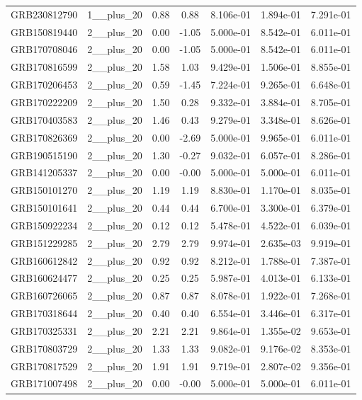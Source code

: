 \documentclass[12pt]{article}
\begin{document}
\begin{table}[h!]
{\begin{tabular}{l c c c c c c}
GRB230812790 & 1__plus_20 & 0.88 & 0.88 & 8.106e-01 & 1.894e-01 & 7.291e-01 \\
GRB150819440 & 2__plus_20 & 0.00 & -1.05 & 5.000e-01 & 8.542e-01 & 6.011e-01 \\
GRB170708046 & 2__plus_20 & 0.00 & -1.05 & 5.000e-01 & 8.542e-01 & 6.011e-01 \\
GRB170816599 & 2__plus_20 & 1.58 & 1.03 & 9.429e-01 & 1.506e-01 & 8.855e-01 \\
GRB170206453 & 2__plus_20 & 0.59 & -1.45 & 7.224e-01 & 9.265e-01 & 6.648e-01 \\
GRB170222209 & 2__plus_20 & 1.50 & 0.28 & 9.332e-01 & 3.884e-01 & 8.705e-01 \\
GRB170403583 & 2__plus_20 & 1.46 & 0.43 & 9.279e-01 & 3.348e-01 & 8.626e-01 \\
GRB170826369 & 2__plus_20 & 0.00 & -2.69 & 5.000e-01 & 9.965e-01 & 6.011e-01 \\
GRB190515190 & 2__plus_20 & 1.30 & -0.27 & 9.032e-01 & 6.057e-01 & 8.286e-01 \\
GRB141205337 & 2__plus_20 & 0.00 & -0.00 & 5.000e-01 & 5.000e-01 & 6.011e-01 \\
GRB150101270 & 2__plus_20 & 1.19 & 1.19 & 8.830e-01 & 1.170e-01 & 8.035e-01 \\
GRB150101641 & 2__plus_20 & 0.44 & 0.44 & 6.700e-01 & 3.300e-01 & 6.379e-01 \\
GRB150922234 & 2__plus_20 & 0.12 & 0.12 & 5.478e-01 & 4.522e-01 & 6.039e-01 \\
GRB151229285 & 2__plus_20 & 2.79 & 2.79 & 9.974e-01 & 2.635e-03 & 9.919e-01 \\
GRB160612842 & 2__plus_20 & 0.92 & 0.92 & 8.212e-01 & 1.788e-01 & 7.387e-01 \\
GRB160624477 & 2__plus_20 & 0.25 & 0.25 & 5.987e-01 & 4.013e-01 & 6.133e-01 \\
GRB160726065 & 2__plus_20 & 0.87 & 0.87 & 8.078e-01 & 1.922e-01 & 7.268e-01 \\
GRB170318644 & 2__plus_20 & 0.40 & 0.40 & 6.554e-01 & 3.446e-01 & 6.317e-01 \\
GRB170325331 & 2__plus_20 & 2.21 & 2.21 & 9.864e-01 & 1.355e-02 & 9.653e-01 \\
GRB170803729 & 2__plus_20 & 1.33 & 1.33 & 9.082e-01 & 9.176e-02 & 8.353e-01 \\
GRB170817529 & 2__plus_20 & 1.91 & 1.91 & 9.719e-01 & 2.807e-02 & 9.356e-01 \\
GRB171007498 & 2__plus_20 & 0.00 & -0.00 & 5.000e-01 & 5.000e-01 & 6.011e-01 \\

\end{tabular}}
\end{table}
\end{document}
